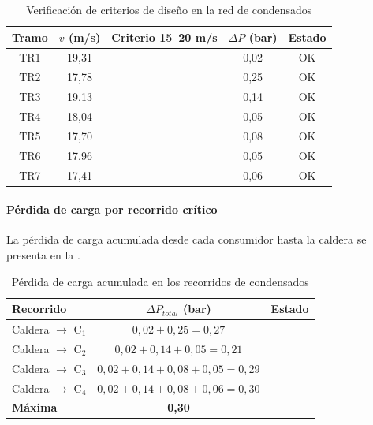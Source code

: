 \begin{table}[H]
	\centering
	\caption{Verificación de criterios de diseño en la red de condensados}
	\label{tab:verificacion-condensados}
	\begin{tabular}{ccccc}
		\toprule
		\textbf{Tramo} & \textbf{$v$ (m/s)} & \textbf{Criterio 15--20 m/s} & \textbf{$\Delta P$ (bar)} & \textbf{Estado} \\
		\midrule
		TR1            & 19{,}31            & \checkmark                   & 0{,}02                    & OK              \\
		TR2            & 17{,}78            & \checkmark                   & 0{,}25                    & OK              \\
		TR3            & 19{,}13            & \checkmark                   & 0{,}14                    & OK              \\
		TR4            & 18{,}04            & \checkmark                   & 0{,}05                    & OK              \\
		TR5            & 17{,}70            & \checkmark                   & 0{,}08                    & OK              \\
		TR6            & 17{,}96            & \checkmark                   & 0{,}05                    & OK              \\
		TR7            & 17{,}41            & \checkmark                   & 0{,}06                    & OK              \\
		\bottomrule
	\end{tabular}
\end{table}

\paragraph{Pérdida de carga por recorrido crítico}

La pérdida de carga acumulada desde cada consumidor hasta la caldera se presenta en la .

\begin{table}[H]
	\centering
	\caption{Pérdida de carga acumulada en los recorridos de condensados}
	\label{tab:perdidas-condensados}
	\begin{tabular}{lcc}
		\toprule
		\textbf{Recorrido}          & \textbf{$\Delta P_{total}$ (bar)}            & \textbf{Estado} \\
		\midrule
		Caldera $\rightarrow$ C$_1$ & $0{,}02 + 0{,}25 = 0{,}27$                   & \checkmark      \\
		Caldera $\rightarrow$ C$_2$ & $0{,}02 + 0{,}14 + 0{,}05 = 0{,}21$          & \checkmark      \\
		Caldera $\rightarrow$ C$_3$ & $0{,}02 + 0{,}14 + 0{,}08 + 0{,}05 = 0{,}29$ & \checkmark      \\
		Caldera $\rightarrow$ C$_4$ & $0{,}02 + 0{,}14 + 0{,}08 + 0{,}06 = 0{,}30$ & \checkmark      \\
		\midrule
		\textbf{Máxima}             & \textbf{0{,}30}                              & \checkmark      \\
		\bottomrule
	\end{tabular}
\end{table}

